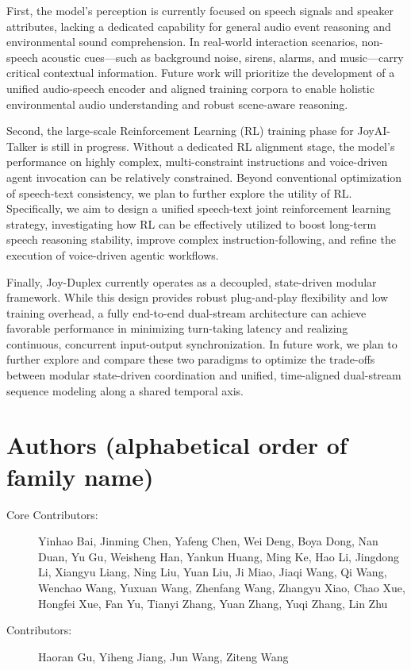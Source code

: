 First, the model's perception is currently focused on speech signals and speaker attributes, lacking a dedicated capability for general audio event reasoning and environmental sound comprehension.  In real-world interaction scenarios, non-speech acoustic cues---such as background noise, sirens, alarms, and music---carry critical contextual information.  Future work will prioritize the development of a unified audio-speech encoder and aligned training corpora to enable holistic environmental audio understanding and robust scene-aware reasoning.

Second, the large-scale Reinforcement Learning (RL) training phase for JoyAI-Talker is still in progress.  Without a dedicated RL alignment stage, the model's performance on highly complex, multi-constraint instructions and voice-driven agent invocation can be relatively constrained.  Beyond conventional optimization of speech-text consistency, we plan to further explore the utility of RL.  Specifically, we aim to design a unified speech-text joint reinforcement learning strategy, investigating how RL can be effectively utilized to boost long-term speech reasoning stability, improve complex instruction-following, and refine the execution of voice-driven agentic workflows.

Finally, Joy-Duplex currently operates as a decoupled, state-driven modular framework.  While this design provides robust plug-and-play flexibility and low training overhead, a fully end-to-end dual-stream architecture can achieve favorable performance in minimizing turn-taking latency and realizing continuous, concurrent input-output synchronization.  In future work, we plan to further explore and compare these two paradigms to optimize the trade-offs between modular state-driven coordination and unified, time-aligned dual-stream sequence modeling along a shared temporal axis.

\section*{Authors (alphabetical order of family name)}



\begin{description}
    \item[Core Contributors:] Yinhao Bai, Jinming Chen, Yafeng Chen, Wei Deng, Boya Dong, Nan Duan, Yu Gu, Weisheng Han, Yankun Huang, Ming Ke, Hao Li, Jingdong Li, Xiangyu Liang, Ning Liu, Yuan Liu, Ji Miao, Jiaqi Wang, Qi Wang, Wenchao Wang, Yuxuan Wang, Zhenfang Wang, Zhangyu Xiao, Chao Xue, Hongfei Xue, Fan Yu, Tianyi Zhang, Yuan Zhang, Yuqi Zhang, Lin Zhu
    \item[Contributors:] Haoran Gu, Yiheng Jiang, Jun Wang, Ziteng Wang
\end{description}


